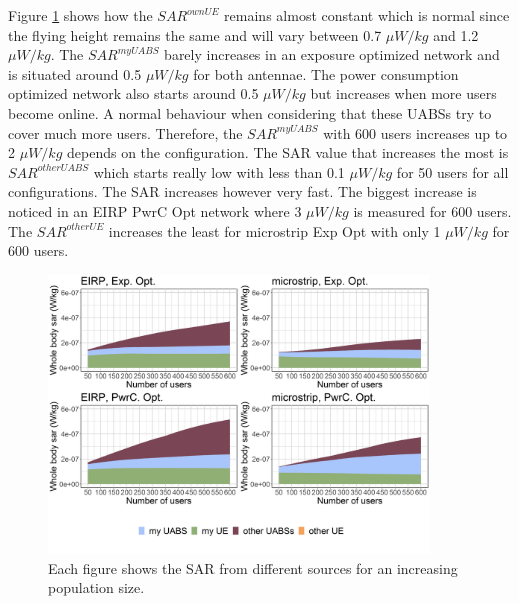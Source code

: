Figure \ref{fig:s3b_fourSourcesMatrix} shows how the  $SAR^{ownUE}$  
remains almost constant which is normal since the flying height remains the same and will 
vary between  0.7 $\mu W/kg$ and 1.2 $\mu W/kg$.
The $SAR^{myUABS}$ barely increases in an exposure optimized network and is situated around 0.5 $\mu W/kg$ for both antennae.
The power consumption optimized network also starts around 0.5 $\mu W/kg$ but increases when more users become online. 
A normal behaviour when considering that these \gls{UABS}s try to cover much more users. Therefore, the $SAR^{myUABS}$ 
with 600 users increases up to 2 $\mu W/kg$ depends on the configuration.
The \gls{SAR} value that increases the most is $SAR^{otherUABS}$ which 
starts really low with less than 0.1 $\mu W/kg$ for 50 users for all configurations. 
The \gls{SAR} increases however very fast. The biggest increase is noticed in an \gls{EIRP} \gls{PwrC Opt} network 
where 3 $\mu W/kg$ is measured for 600 users. The $SAR^{otherUE}$ increases the least for microstrip \gls{Exp Opt} with 
only 1 $\mu W/kg$ for 600 users.
\begin{figure}[h!]
\centering
  \includegraphics[width=0.9\textwidth]{../results/s3/uFourSources.png}
  \caption{Each figure shows the \acs{SAR} from different sources for an increasing population size. 
}
  \label{fig:s3b_fourSourcesMatrix}
\end{figure}


